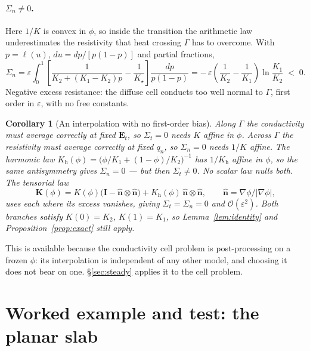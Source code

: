 \documentclass[11pt]{article}
\newtheorem{corollary}{Corollary}
\newcommand{\Gam}{\Gamma}
\newcommand{\bn}{\hat{\mathbf n}}
\newcommand{\bI}{\mathbf I}
\begin{document}
\paragraph{$\Sigma_n\neq0$.} Here $1/K$ is convex in $\phi$, so inside the
transition the arithmetic law underestimates the resistivity that heat crossing
$\Gam$ has to overcome. With $p=\ell(u)$, $du=dp/[p(1-p)]$ and partial
fractions,
\begin{equation}
\Sigma_n=\varepsilon\!\int_0^1\!\left[\frac{1}{K_2+(K_1-K_2)p}-\frac{1}{K_\star}\right]\frac{dp}{p(1-p)}
=-\,\varepsilon\left(\frac{1}{K_2}-\frac{1}{K_1}\right)\ln\frac{K_1}{K_2}\;<\;0 .
\label{eq:sigman}
\end{equation}
Negative excess resistance: the diffuse cell conducts too well normal to $\Gam$,
first order in $\varepsilon$, with no free constants.

\begin{corollary}[An interpolation with no first-order bias]
\label{cor:tensor}
Along $\Gam$ the conductivity must average correctly at fixed $\mathbf E_t$, so
$\Sigma_t=0$ needs $K$ affine in $\phi$. Across $\Gam$ the resistivity must
average correctly at fixed $q_n$, so $\Sigma_n=0$ needs $1/K$ affine. The
harmonic law $K_{\mathrm h}(\phi)=\big(\phi/K_1+(1-\phi)/K_2\big)^{-1}$
has $1/K_{\mathrm h}$ affine in $\phi$, so the same antisymmetry gives
$\Sigma_n=0$ --- but then $\Sigma_t\neq0$. No scalar law nulls both. The
tensorial law
\begin{equation}
\mathbf K(\phi)=K(\phi)\big(\bI-\bn\otimes\bn\big)
+K_{\mathrm h}(\phi)\,\bn\otimes\bn,
\qquad \bn=\nabla\phi/|\nabla\phi|,
\label{eq:tensorK}
\end{equation}
uses each where its excess vanishes, giving $\Sigma_t=\Sigma_n=0$ and
$\mathcal O(\varepsilon^2)$. Both branches satisfy $K(0)=K_2$, $K(1)=K_1$, so
Lemma~\ref{lem:identity} and Proposition~\ref{prop:exact} still apply.
\end{corollary}

\noindent
This is available because the conductivity cell problem is post-processing on a
frozen $\phi$: its interpolation is independent of any other model, and
choosing it does not bear on one. \S\ref{sec:steady} applies it to the
cell problem.

\section{Worked example and test: the planar slab}
\label{sec:slab}
\end{document}
